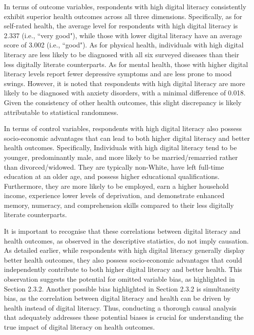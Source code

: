 In terms of outcome variables, respondents with high digital literacy consistently exhibit superior health outcomes across all three dimensions. Specifically, as for self-rated health, the average level for respondents with high digital literacy is 2.337 (i.e., ``very good"), while those with lower digital literacy have an average score of 3.002 (i.e., ``good"). As for physical health, individuals with high digital literacy are less likely to be diagnosed with all six surveyed diseases than their less digitally literate counterparts. As for mental health, those with higher digital literacy levels report fewer depressive symptoms and are less prone to mood swings. However, it is noted that respondents with high digital literacy are more likely to be diagnosed with anxiety disorders, with a minimal difference of 0.018. Given the consistency of other health outcomes, this slight discrepancy is likely attributable to statistical randomness.

In terms of control variables, respondents with high digital literacy also possess socio-economic advantages that can lead to both higher digital literacy and better health outcomes. Specifically, Individuals with high digital literacy tend to be younger, predominantly male, and more likely to be married/remarried rather than divorced/widowed. They are typically non-White, have left full-time education at an older age, and possess higher educational qualifications. Furthermore, they are more likely to be employed, earn a higher household income, experience lower levels of deprivation, and demonstrate enhanced memory, numeracy, and comprehension skills compared to their less digitally literate counterparts.

It is important to recognise that these correlations between digital literacy and health outcomes, as observed in the descriptive statistics, do not imply causation. As detailed earlier, while respondents with high digital literacy generally display better health outcomes, they also possess socio-economic advantages that could independently contribute to both higher digital literacy and better health. This observation suggests the potential for omitted variable bias, as highlighted in Section 2.3.2. Another possible bias highlighted in Section 2.3.2 is simultaneity bias, as the correlation between digital literacy and health can be driven by health instead of digital literacy. Thus, conducting a thorough causal analysis that adequately addresses these potential biases is crucial for understanding the true impact of digital literacy on health outcomes.

